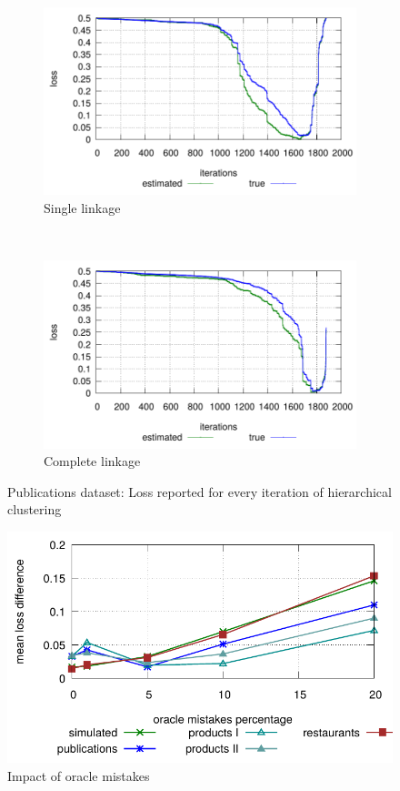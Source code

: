 \documentclass[12pt]{article}
\begin{document}
\begin{figure}[t]
    \centering
    \begin{subfigure}[t]{0.5\textwidth}
        \centering
        \includegraphics[trim=100 0 100 0, width=0.5\linewidth,valign=t]{figures/deDuplication/plot_real_s.pdf}
        \caption{Single linkage}
    \end{subfigure}%
    ~ 
    \begin{subfigure}[t]{0.5\textwidth}
        \centering
        \includegraphics[trim=100 0 100 0, width=0.5\linewidth,valign=t]{figures/deDuplication/plot_real_c.pdf}
        \caption{Complete linkage}
    \end{subfigure}
	\caption{Publications dataset: Loss reported for every iteration of hierarchical clustering}
    \label{fig:publications}
\end{figure}

\begin{figure}[t]
    \centering
    \includegraphics[trim=0 0 0 0, width=\linewidth,valign=t]{figures/deDuplication/plot_oracle_error.pdf}
    \caption{Impact of oracle mistakes}
    \label{fig:oracle-error}
\end{figure}
    
\end{document}
